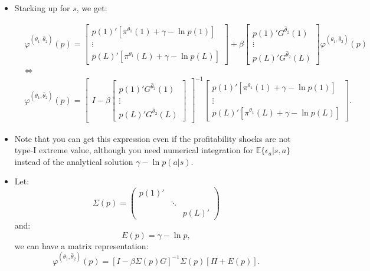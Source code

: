 \documentclass[]{book}
\begin{document}
\begin{itemize}
\item
  Stacking up for \(s\), we get:

  \begin{equation}
  \begin{split}
  &\varphi^{(\theta_1, \hat{\theta}_2)}(p) =
  \begin{bmatrix}
  p(1)'[\pi^{\theta_1}(1) + \gamma - \ln p(1)]\\
  \vdots\\
  p(L)'[\pi^{\theta_1}(L) + \gamma - \ln p(L)]
  \end{bmatrix}
  +\beta
  \begin{bmatrix}
  p(1)' G^{\hat{\theta}_2}(1)\\
  \vdots\\
  p(L)' G^{\hat{\theta}_2}(L)
  \end{bmatrix}
  \varphi^{(\theta_1, \hat{\theta}_2)}(p)\\
  &\Leftrightarrow\\
  &\varphi^{(\theta_1, \hat{\theta}_2)}(p) = 
  \begin{bmatrix}
  I -
  \beta
  \begin{bmatrix}
  p(1)' G^{\hat{\theta}_2}(1)\\
  \vdots\\
  p(L)' G^{\hat{\theta}_2}(L)
  \end{bmatrix}
  \end{bmatrix}^{-1}
  \begin{bmatrix}
  p(1)'[\pi^{\theta_1}(1) + \gamma - \ln p(1)]\\
  \vdots\\
  p(L)'[\pi^{\theta_1}(L) + \gamma - \ln p(L)]
  \end{bmatrix}.
  \end{split}
  \end{equation}
\item
  Note that you can get this expression even if the profitability shocks
  are not type-I extreme value, although you need numerical integration
  for \(\mathbb{E}\{\epsilon_a|s, a\}\) instead of the analytical
  solution \(\gamma - \ln p(a|s)\).
\item
  Let: \[
  \Sigma(p) =
  \begin{pmatrix}
  p(1)' & & \\
   & \ddots & \\
   & & p(L)'
  \end{pmatrix}
  \] and: \[
  E(p) = 
  \gamma - \ln p,
  \] we can have a matrix representation: \[
  \varphi^{(\theta_1, \hat{\theta}_2)}(p) = [I - \beta \Sigma(p) G]^{-1}\Sigma(p)[\Pi + E(p)].
  \]
\end{itemize}
\end{document}
